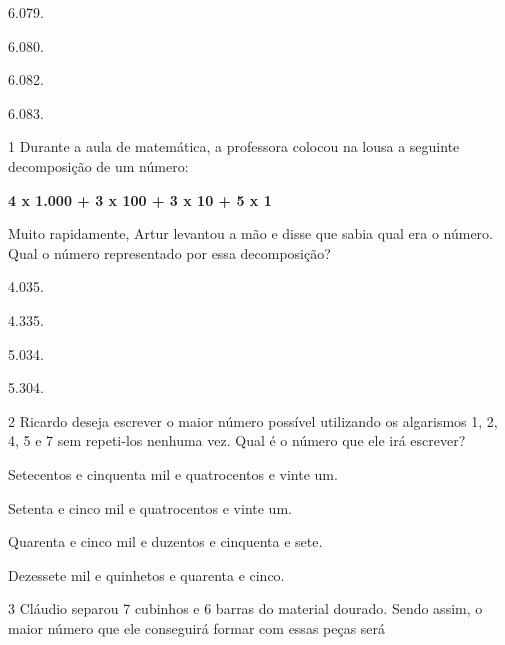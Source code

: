\begin{escolha}
\item
  6.079.
\item
  6.080.
\item
  6.082.
\item
  6.083.
\end{escolha}

\pagebreak

\vspace*{-3.4cm}

\pagebreak

\num{1} Durante a aula de matemática, a professora colocou na lousa a seguinte decomposição de um número:

\begin{myquote}
\centering
\textbf{4 x 1.000 + 3 x 100 + 3 x 10 + 5 x 1}
\end{myquote}

Muito rapidamente, Artur levantou a mão e disse que sabia qual era o número. Qual o número representado por essa decomposição?

\begin{escolha}
\item
  4.035.
\item
  4.335.
\item
  5.034.
\item
  5.304.
\end{escolha}

\num{2} Ricardo deseja escrever o maior número possível utilizando os algarismos 1, 2, 4, 5 e 7 sem repeti-los nenhuma vez. Qual é o número que ele irá escrever?

\begin{escolha}
\item
  Setecentos e cinquenta mil e quatrocentos e vinte um.
\item
  Setenta e cinco mil e quatrocentos e vinte um.
\item
  Quarenta e cinco mil e duzentos e cinquenta e sete.
\item
  Dezessete mil e quinhetos e quarenta e cinco.
\end{escolha}


\num{3} Cláudio separou 7 cubinhos e 6 barras do material dourado. Sendo assim, o maior número que ele conseguirá formar com essas peças será

